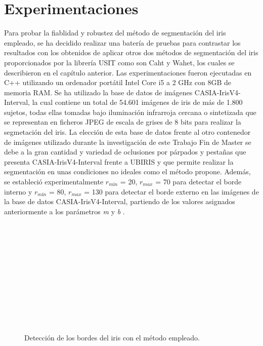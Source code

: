 \section{Experimentaciones}

Para probar la fiablidad y robustez del método de segmentación del iris empleado, se ha decidido realizar una batería de pruebas para contrastar los resultados con los obtenidos de aplicar otros dos métodos de segmentación del iris proporcionados por la librería USIT como son Caht y Wahet, los cuales se describieron en el capítulo anterior. Las experimentaciones fueron ejecutadas en C++ utilizando un ordenador portátil Intel Core i5 a 2 GHz con 8GB de memoria RAM. Se ha utilizado la base de datos de imágenes CASIA-IrisV4-Interval, la cual contiene un total de 54.601 imágenes de iris de más de 1.800 sujetos, todas ellas tomadas bajo iluminación infrarroja cercana o sintetizada que se representan en ficheros JPEG de escala de grises de 8 bits para realizar la segmetación del iris. La elección de esta base de datos frente al otro contenedor de imágenes utilizado durante la investigación de este Trabajo Fin de Master se debe a la gran cantidad y variedad de oclusiones por párpados y pestañas que presenta CASIA-IrisV4-Interval frente a UBIRIS y que permite realizar la segmentación en unas condiciones no ideales como el método propone. Además, se estableció experimentalmente $r_{mín}$ = 20, $r_{max}$ = 70 para detectar el borde interno y $r_{mín}$ = 80, $r_{max}$ = 130 para detectar el borde externo en las imágenes de la base de datos CASIA-IrisV4-Interval, partiendo de los valores asignados anteriormente a los parámetros \textit{m} y \textit{b} . \\  \\  \\ \\ \\ \\ \\ \\ \\ \\ \\ \\ 

\begin{figure}[htbp]
\centering
{}
\caption{Detección de los bordes del iris con el método empleado.} \label{fig:señales}
\end{figure}

